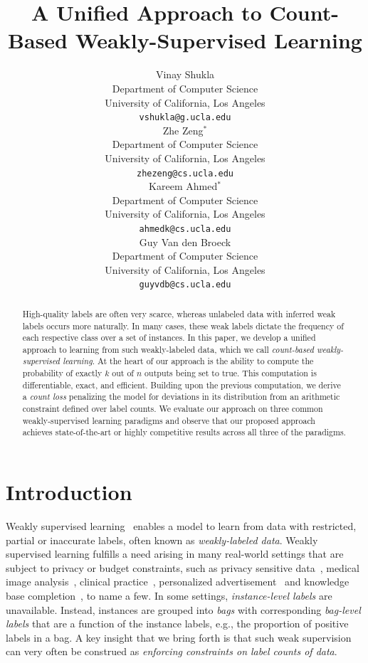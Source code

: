 \documentclass{article}
\title{A Unified Approach to Count-Based Weakly-Supervised Learning}
\author{%
  Vinay Shukla \\
  Department of Computer Science\\
  University of California, Los Angeles\\
  \texttt{vshukla@g.ucla.edu} \\
  \And
  Zhe Zeng$^*$ \\
  Department of Computer Science\\
  University of California, Los Angeles\\
  \texttt{zhezeng@cs.ucla.edu} \\
  \And
  Kareem Ahmed$^*$ \\
  Department of Computer Science\\
  University of California, Los Angeles\\
  \texttt{ahmedk@cs.ucla.edu} \\
  \And
  Guy Van den Broeck \\
  Department of Computer Science\\
  University of California, Los Angeles\\
  \texttt{guyvdb@cs.ucla.edu} \\
}
\begin{document}
\maketitle
\def\thefootnote{*}\def\thefootnote{\arabic{footnote}}

\begin{abstract}
High-quality labels are often very scarce, whereas unlabeled data with inferred weak labels occurs more naturally.
In many cases, these weak labels dictate the frequency of each respective class over a set of instances.
In this paper, we develop a unified approach to learning from such weakly-labeled data, which we call \emph{count-based weakly-supervised learning}.
At the heart of our approach is the ability to compute the probability of exactly $k$ out of $n$ outputs being set to true.
This computation is differentiable, exact, and efficient.
Building upon the previous computation, we derive a \emph{count loss} penalizing the model for deviations in its distribution
from an arithmetic constraint defined over label counts. 
We evaluate our approach on three 
common weakly-supervised learning paradigms and observe that our proposed approach achieves state-of-the-art or highly competitive results across all three of the paradigms.
\end{abstract}








\section{Introduction}\label{sec:intro}

Weakly supervised learning~\citep{zhou2018brief} enables a model to learn from data with restricted, partial or inaccurate labels, often known as \emph{weakly-labeled data}.
Weakly supervised learning fulfills a need arising in many real-world settings that are subject to privacy or budget constraints, such as privacy sensitive data~\citep{wojtusiak2011using},  medical image analysis~\citep{bortsova2018deep}, clinical practice~\citep{quellec2017multiple}, personalized advertisement~\citep{bekker2020learning} and knowledge base completion~\citep{galarraga2015fast,zupanc2018estimating}, to name a few.
In some settings, \emph{instance-level labels} are unavailable.
Instead, instances are grouped into \emph{bags} with corresponding \emph{bag-level labels} that are a function of the instance labels, e.g., the proportion of positive labels in a bag.
A key insight that we bring forth is that such weak supervision can very often be construed as \emph{enforcing constraints on label counts of data}.
\end{document}
